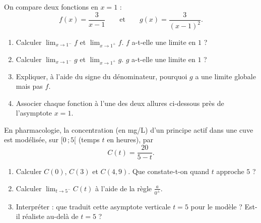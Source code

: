 \documentclass[11pt,a4paper]{article}
\begin{document}
\begin{exercice}
On compare deux fonctions en $x=1$ :
\[ f(x)=\frac{3}{x-1}\qquad\text{et}\qquad g(x)=\frac{3}{(x-1)^2}. \]
\begin{enumerate}[label=\alph*),leftmargin=2em,itemsep=3pt]
  \item Calculer $\displaystyle\lim_{x\to 1^{-}} f$ et $\displaystyle\lim_{x\to 1^{+}} f$. $f$ a-t-elle une limite en $1$ ?
  \item Calculer $\displaystyle\lim_{x\to 1^{-}} g$ et $\displaystyle\lim_{x\to 1^{+}} g$. $g$ a-t-elle une limite en $1$ ?
  \item Expliquer, à l'aide du signe du dénominateur, pourquoi $g$ a une limite globale mais pas $f$.
  \item Associer chaque fonction à l'une des deux allures ci-dessous près de l'asymptote $x=1$.
\end{enumerate}
\begin{center}
\end{center}
\end{exercice}

\begin{exercice}
En pharmacologie, la concentration (en mg/L) d'un principe actif dans une cuve est modélisée, sur
$[0\,;5[$ (temps $t$ en heures), par
\[ C(t)=\frac{20}{5-t}. \]
\begin{enumerate}[label=\alph*),leftmargin=2em,itemsep=3pt]
  \item Calculer $C(0)$, $C(3)$ et $C(4{,}9)$. Que constate-t-on quand $t$ approche $5$ ?
  \item Calculer $\displaystyle\lim_{t\to 5^{-}} C(t)$ à l'aide de la règle $\frac{a}{0^{\pm}}$.
  \item Interpréter : que traduit cette asymptote verticale $t=5$ pour le modèle ? Est-il réaliste
        au-delà de $t=5$ ?
\end{enumerate}
\end{exercice}
\end{document}
